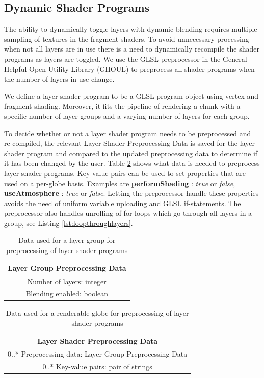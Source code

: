 \subsection{Dynamic Shader Programs}

The ability to dynamically toggle layers with dynamic blending requires multiple sampling of textures in the fragment shaders. To avoid unnecessary processing when not all layers are in use there is a need to dynamically recompile the shader programs as layers are toggled. We use the GLSL preprocessor in the General Helpful Open Utility Library (GHOUL) \cite{ghoul} to preprocess all shader programs when the number of layers in use change.

We define a layer shader program to be a GLSL program object using vertex and fragment shading. Moreover, it fits the pipeline of rendering a chunk with a specific number of layer groups and a varying number of layers for each group.

To decide whether or not a layer shader program needs to be preprocessed and re-compiled, the relevant Layer Shader Preprocessing Data is saved for the layer shader program and compared to the updated preprocessing data to determine if it has been changed by the user. Table \ref{table:layergrouppreprocessingdata} shows what data is needed to preprocess layer shader programs. Key-value pairs can be used to set properties that are used on a per-globe basis. Examples are \textbf{performShading} : \emph{true} or \emph{false}, \textbf{useAtmosphere} : \emph{true} or \emph{false}. Letting the preprocessor handle these properties avoids the need of uniform variable uploading and GLSL if-statements. The preprocessor also handles unrolling of for-loops which go through all layers in a group, see Listing \ref{lst:loopthroughlayers}.


\begin{table}
\centering 
\caption[]{Data used for a layer group for preprocessing of layer shader programs}
\label{table:layergrouppreprocessingdata}
\begin{tabular}{ c }    
    	\hline
        \textbf{Layer Group Preprocessing Data} \\ 
    	\hline
	Number of layers: integer \\
    	Blending enabled: boolean \\
	\hline
\end{tabular}
\end{table}

\begin{table}
\centering
\caption[]{Data used for a renderable globe for preprocessing of layer shader programs}
\label{table:layergrouppreprocessingdata}
\begin{tabular}{ c }
    
    	\hline
        \textbf{Layer Shader Preprocessing Data} \\ 
    	\hline
	0..* Preprocessing data: Layer Group Preprocessing Data \\
    	0..* Key-value pairs: pair of strings \\
    	\hline
    
\end{tabular}
\end{table}

